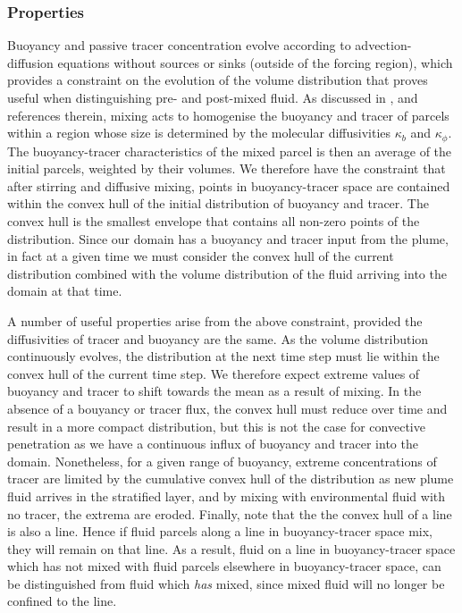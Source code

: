 \documentclass[a4paper]{article}
\begin{document}
\subsubsection{Properties}
\label{sec:PDFproperties}
Buoyancy and passive tracer concentration evolve according to advection-diffusion equations without sources or
sinks (outside of the forcing region), which provides a constraint on the evolution of the volume distribution
that proves useful when distinguishing pre- and post-mixed fluid. As discussed in \citet{penney2020},
\citet{plumb2007} and references therein, mixing acts to homogenise the buoyancy and tracer of parcels within
a region whose size is determined by the molecular diffusivities $\kappa_b$ and $\kappa_{\phi}$. The
buoyancy-tracer characteristics of the mixed parcel is then an average of the initial parcels, weighted by
their volumes. We therefore have the constraint that after stirring and diffusive mixing, points in
buoyancy-tracer space are contained within the convex hull of the initial distribution of buoyancy and tracer.
The convex hull is the smallest envelope that contains all non-zero points of the distribution. Since our
domain has a buoyancy and tracer input from the plume, in fact at a given time we must consider the convex
hull of the current distribution combined with the volume distribution of the fluid arriving into the
domain at that time.

A number of useful properties arise from the above constraint, provided the diffusivities of tracer and
buoyancy are the same. As the volume distribution continuously evolves, the distribution at the next time step
must lie within the convex hull of the current time step. We therefore expect extreme values of buoyancy and
tracer to shift towards the mean as a result of mixing. In the absence of a bouyancy or tracer flux, the
convex hull must reduce over time and result in a more compact distribution, but this is not the case for
convective penetration as we have a continuous influx of buoyancy and tracer into the domain. Nonetheless, for
a given range of buoyancy, extreme concentrations of tracer are limited by the cumulative convex hull of the
distribution as new plume fluid arrives in the stratified layer, and by mixing with environmental fluid with
no tracer, the extrema are eroded. Finally, note that the the convex hull of a line is also a line.  Hence if
fluid parcels along a line in buoyancy-tracer space mix, they will remain on that line. As a result,
fluid on a line in buoyancy-tracer space which has not mixed with fluid parcels elsewhere in buoyancy-tracer
space, can be distinguished from fluid which \emph{has} mixed, since mixed fluid will no longer be confined to
the line.
\end{document}
